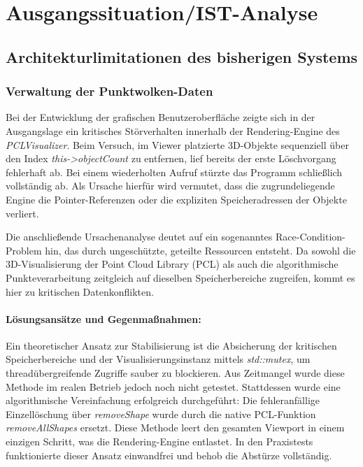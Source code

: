 \chapter{Ausgangssituation/IST-Analyse}
\label{Ausgangssituation/IST-Analyse}

\section{Architekturlimitationen des bisherigen Systems}
\label{kap:Architekturlimitationen}

\subsection{Verwaltung der Punktwolken-Daten}
\label{kap:Verwaltung der Punktwolke-Daten}
Bei der Entwicklung der grafischen Benutzeroberfläche zeigte sich in der Ausgangslage ein kritisches Störverhalten innerhalb der Rendering-Engine des \textit{PCLVisualizer}. Beim Versuch, im Viewer platzierte 3D-Objekte sequenziell über den Index \textit{this->objectCount} zu entfernen, lief bereits der erste Löschvorgang fehlerhaft ab. Bei einem wiederholten Aufruf stürzte das Programm schließlich vollständig ab. Als Ursache hierfür wird vermutet, dass die zugrundeliegende Engine die Pointer-Referenzen oder die expliziten Speicheradressen der Objekte verliert.

Die anschließende Ursachenanalyse deutet auf ein sogenanntes Race-Condition-Problem hin, das durch ungeschützte, geteilte Ressourcen entsteht. Da sowohl die 3D-Visualisierung der Point Cloud Library (PCL) als auch die algorithmische Punkteverarbeitung zeitgleich auf dieselben Speicherbereiche zugreifen, kommt es hier zu kritischen Datenkonflikten.

\subsubsection*{Lösungsansätze und Gegenmaßnahmen:}
Ein theoretischer Ansatz zur Stabilisierung ist die Absicherung der kritischen Speicherbereiche und der Visualisierungsinstanz mittels \textit{std::mutex}, um threadübergreifende Zugriffe sauber zu blockieren. Aus Zeitmangel wurde diese Methode im realen Betrieb jedoch noch nicht getestet. Stattdessen wurde eine algorithmische Vereinfachung erfolgreich durchgeführt: Die fehleranfällige Einzellöschung über \textit{removeShape} wurde durch die native PCL-Funktion \textit{removeAllShapes} ersetzt. Diese Methode leert den gesamten Viewport in einem einzigen Schritt, was die Rendering-Engine entlastet. In den Praxistests funktionierte dieser Ansatz einwandfrei und behob die Abstürze vollständig.

